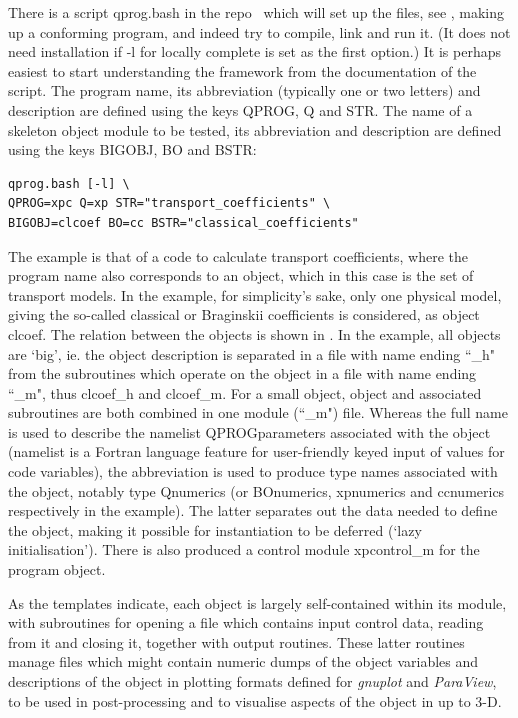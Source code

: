 There is a script qprog.bash in the repo~\cite{qprogwebsite}
which will set up the files, see , making up a conforming program, and indeed
try to compile, link and run it.
(It does not need  installation if -l for locally complete is set as the first option.)
It is perhaps easiest to start understanding the framework from the documentation of the script.
The program name, its abbreviation (typically one or two letters) and description are defined using
the keys QPROG, Q and STR. The name of a skeleton object module to be tested, its abbreviation
and description are defined using the keys BIGOBJ, BO and BSTR:
\begin{verbatim}
qprog.bash [-l] \
QPROG=xpc Q=xp STR="transport_coefficients" \
BIGOBJ=clcoef BO=cc BSTR="classical_coefficients"
\end{verbatim}
The example is that of a code \I{xpc} to calculate transport coefficients, where
the program name also corresponds to an object, which in this case is the set of
transport models. In the example, for simplicity's sake, only one physical model,
giving the so-called classical or Braginskii coefficients is considered, as object clcoef.
The relation between the objects is shown in \Fig{xpch}. In the example, all objects
are `big', ie. the object description is separated in a file with name ending ``\_h"
from the subroutines which operate on the object in a file with name ending ``\_m",
thus clcoef\_h and clcoef\_m. For a small object, object and associated subroutines
are both combined in one module (``\_m") file. Whereas the full name is used to
describe the namelist QPROGparameters associated with the object 
(namelist is a Fortran language feature for user-friendly keyed
input of values for code variables),
the abbreviation is used to produce type names associated with the object,
notably type Qnumerics (or BOnumerics, xpnumerics and ccnumerics
respectively in the example). The latter separates out the data needed to define
the object, making it possible for instantiation to be deferred (`lazy initialisation').
There is also produced a control module xpcontrol\_m for the program object.

As the templates indicate, each object is largely self-contained within its
module, with subroutines for opening a file which contains input control data, reading from it
and closing it, together with output routines. These latter routines manage files which
might contain numeric dumps of the object variables and descriptions of the
object in plotting formats defined for {\it gnuplot} and {\it ParaView}, to be used in post-processing 
and to visualise aspects of the object in up to 3-D.

